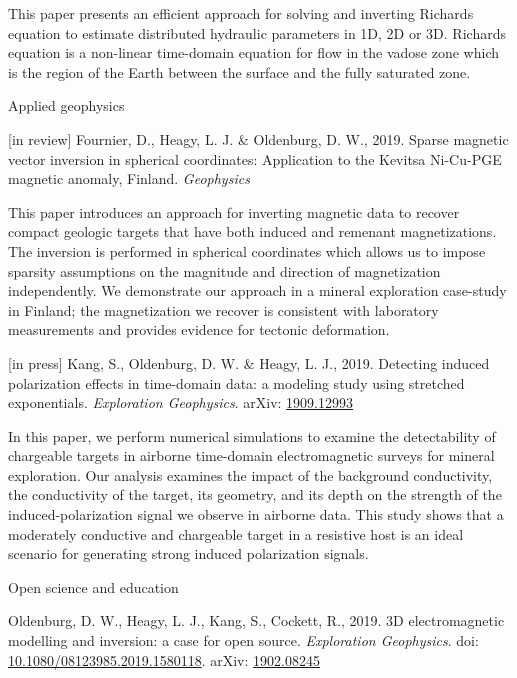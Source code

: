 \documentclass[a4paper, 11pt]{article}
\newcommand{\arxiv}[1]{arXiv: \href{https://arxiv.org/abs/#1}{#1}}
\newcommand{\doi}[1]{doi: \href{https://doi.org/#1}{#1}}
\newcommand{\subheading}[1]{
    \vspace{0.5cm}
    {\Large #1}\\
    \vspace{-0.2cm}
}
\begin{document}
This paper presents an efficient approach for solving and inverting Richards equation to estimate distributed hydraulic parameters in 1D, 2D or 3D. Richards equation is a non-linear time-domain equation for flow in the vadose zone which is the region of the Earth between the surface and the fully saturated zone.

\subheading{Applied geophysics}

\begin{myitemize}
    \item{[in review] Fournier, D., Heagy, L. J. \& Oldenburg, D. W., 2019. Sparse magnetic vector inversion in spherical coordinates: Application to the Kevitsa Ni-Cu-PGE magnetic anomaly, Finland. \emph{Geophysics}}
\end{myitemize}

This paper introduces an approach for inverting magnetic data to recover compact geologic targets that have both induced and remenant magnetizations. The inversion is performed in spherical coordinates which allows us to impose sparsity assumptions on the magnitude and direction of magnetization independently. We demonstrate our approach in a mineral exploration case-study in Finland; the magnetization we recover is consistent with laboratory measurements and provides evidence for tectonic deformation. \\

\begin{myitemize}
    \item{[in press] Kang, S., Oldenburg, D. W. \& Heagy, L. J., 2019. Detecting induced polarization effects in time-domain data: a modeling study using stretched exponentials. \emph{Exploration Geophysics}. \arxiv{1909.12993}}
\end{myitemize}

In this paper, we perform numerical simulations to examine the detectability of chargeable targets in airborne time-domain electromagnetic surveys for mineral exploration. Our analysis examines the impact of the background conductivity, the conductivity of the target, its geometry, and its depth on the strength of the induced-polarization signal we observe in airborne data. This study shows that a moderately conductive and chargeable target in a resistive host is an ideal scenario for generating strong induced polarization signals.

\subheading{Open science and education}

\begin{myitemize}
\item Oldenburg, D. W., Heagy, L. J., Kang, S., Cockett, R., 2019. 3D electromagnetic modelling and inversion: a case for open source. \emph{Exploration Geophysics}. \doi{10.1080/08123985.2019.1580118}. \arxiv{1902.08245}
\end{myitemize}
\end{document}
